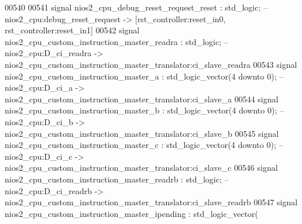 \begin{DoxyCode}
00540 
00541     \textcolor{keywordflow}{signal} \textcolor{vhdlchar}{nios2_cpu_debug_reset_request_reset}                                         \textcolor{vhdlchar}{:} \textcolor{comment}{std\_logic};\textcolor{keyword}{        
                   -- nios2\_cpu:debug\_reset\_request -> [rst\_controller:reset\_in0, rst\_controller:reset\_in1]}
00542     \textcolor{keywordflow}{signal} \textcolor{vhdlchar}{nios2_cpu_custom_instruction_master_readra}                                  \textcolor{vhdlchar}{:} \textcolor{comment}{std\_logic};\textcolor{keyword}{        
                   -- nios2\_cpu:D\_ci\_readra -> nios2\_cpu\_custom\_instruction\_master\_translator:ci\_slave\_readra}
00543     \textcolor{keywordflow}{signal} \textcolor{vhdlchar}{nios2_cpu_custom_instruction_master_a}                                       \textcolor{vhdlchar}{:} \textcolor{comment}{std\_logic\_vector}\textcolor{vhdlchar}{(}\textcolor{vhdllogic}{}\textcolor{vhdllogic}{4}
       \textcolor{keywordflow}{downto} \textcolor{vhdllogic}{}\textcolor{vhdllogic}{0}\textcolor{vhdlchar}{)};\textcolor{keyword}{  -- nios2\_cpu:D\_ci\_a -> nios2\_cpu\_custom\_instruction\_master\_translator:ci\_slave\_a}
00544     \textcolor{keywordflow}{signal} \textcolor{vhdlchar}{nios2_cpu_custom_instruction_master_b}                                       \textcolor{vhdlchar}{:} \textcolor{comment}{std\_logic\_vector}\textcolor{vhdlchar}{(}\textcolor{vhdllogic}{}\textcolor{vhdllogic}{4}
       \textcolor{keywordflow}{downto} \textcolor{vhdllogic}{}\textcolor{vhdllogic}{0}\textcolor{vhdlchar}{)};\textcolor{keyword}{  -- nios2\_cpu:D\_ci\_b -> nios2\_cpu\_custom\_instruction\_master\_translator:ci\_slave\_b}
00545     \textcolor{keywordflow}{signal} \textcolor{vhdlchar}{nios2_cpu_custom_instruction_master_c}                                       \textcolor{vhdlchar}{:} \textcolor{comment}{std\_logic\_vector}\textcolor{vhdlchar}{(}\textcolor{vhdllogic}{}\textcolor{vhdllogic}{4}
       \textcolor{keywordflow}{downto} \textcolor{vhdllogic}{}\textcolor{vhdllogic}{0}\textcolor{vhdlchar}{)};\textcolor{keyword}{  -- nios2\_cpu:D\_ci\_c -> nios2\_cpu\_custom\_instruction\_master\_translator:ci\_slave\_c}
00546     \textcolor{keywordflow}{signal} \textcolor{vhdlchar}{nios2_cpu_custom_instruction_master_readrb}                                  \textcolor{vhdlchar}{:} \textcolor{comment}{std\_logic};\textcolor{keyword}{        
                   -- nios2\_cpu:D\_ci\_readrb -> nios2\_cpu\_custom\_instruction\_master\_translator:ci\_slave\_readrb}
00547     \textcolor{keywordflow}{signal} \textcolor{vhdlchar}{nios2_cpu_custom_instruction_master_ipending}                                \textcolor{vhdlchar}{:} \textcolor{comment}{std\_logic\_vector}\textcolor{vhdlchar}{(}\textcolor{vhdllogic}{}\textcolor{vhdllogic}{
}
\end{DoxyCode}
